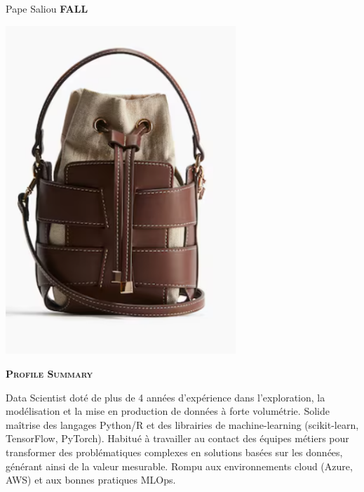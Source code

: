 \documentclass[11pt,a4paper]{article}
\newcommand{\headleft}[1]{\vspace*{3ex}\textsc{\textbf{#1}}\par%
    \vspace*{-1.5ex}\hrulefill\par\vspace*{0.7ex}}
\begin{document}
\setlength{\topskip}{0pt}\setlength{\parindent}{0pt}\setlength{\parskip}{0pt}
\setlength{\fboxsep}{0pt}\pagestyle{empty}\raggedbottom

\begin{minipage}[t]{0.33\textwidth}
\colorbox{cvblue}{\begin{minipage}[t][5mm][t]{\textwidth}\null\hfill\null\end{minipage}}
\vspace{-.2ex}
\colorbox{cvblue!90}{\color{white}
\textwidth
\begin{minipage}[t][293mm][t]{0.82\textwidth}\raggedright
\vspace*{2.5ex}

\Large Pape Saliou \textbf{\textsc{FALL}} \normalsize

\null\hfill\includegraphics[width=0.65\textwidth]{ 388222cafab34dbc9168e4c41a4725be.png }\hfill\null

\vspace*{0.5ex}

\headleft{Profile Summary}
Data Scientist doté de plus de 4 années d’expérience dans l’exploration, la modélisation et la mise en production de données à forte volumétrie. Solide maîtrise des langages Python/R et des librairies de machine-learning (scikit-learn, TensorFlow, PyTorch). Habitué à travailler au contact des équipes métiers pour transformer des problématiques complexes en solutions basées sur les données, générant ainsi de la valeur mesurable. Rompu aux environnements cloud (Azure, AWS) et aux bonnes pratiques MLOps.


\end{minipage}}
\end{minipage}
\end{document}
